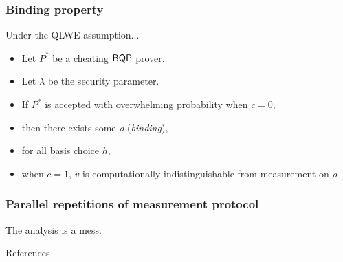\documentclass{beamer}
\begin{document}
\begin{frame}
	\frametitle{Binding property}
	Under the QLWE assumption...
	\begin{itemize}[<+->]
		\item Let $P^*$ be a cheating $\operatorname{\mathsf{BQP}}$ prover.
		\item Let $\lambda$ be the security parameter.
		\item If $P^*$ is accepted with overwhelming probability when $c=0$,
		\item then there exists some $\rho$ (\emph{binding}),
		\item for all basis choice $h$,
		\item when $c=1$, $v$ is computationally indistinguishable from measurement on $\rho$
	\end{itemize}
\end{frame}

\begin{frame}
	\frametitle{Parallel repetitions of measurement protocol}
	The analysis is a mess.
\end{frame}

\begin{frame}{References}
	
	
\end{frame}
\end{document}

